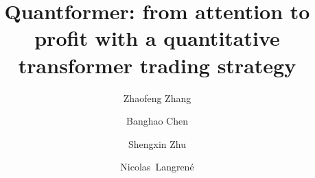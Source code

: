 \documentclass[preprint,12pt]{elsarticle}
\begin{document}
\begin{frontmatter}



\title{Quantformer: from attention to profit with a quantitative transformer trading strategy}


\author[1,3,5]{Zhaofeng Zhang } %
\author[1,4,6]{Banghao Chen } %
\author[2,1,4]{Shengxin Zhu } 
\author[1,3]{Nicolas~Langrené } %




\end{frontmatter}
\end{document}

